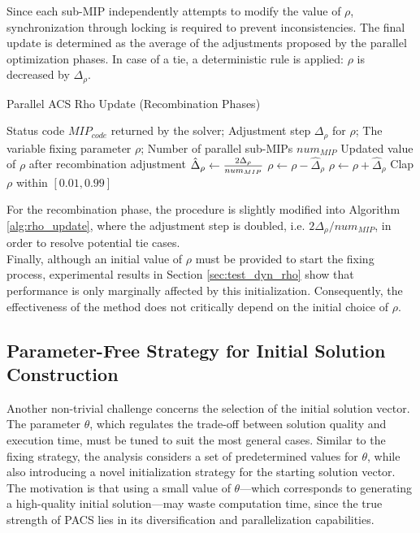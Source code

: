 Since each sub-MIP independently attempts to modify the value of $\rho$, synchronization through locking is required to prevent inconsistencies. The final update is determined as the average of the adjustments proposed by the parallel optimization phases. In case of a tie, a deterministic rule is applied: $\rho$ is decreased by $\Delta_\rho$.  
\begin{algorithm}[H]
\caption{Parallel ACS Rho Update (Recombination Phases)}\label{alg:rho_update}
\begin{algorithmic}[1]
\Require Status code $MIP_{code}$ returned by the solver; Adjustment step $\Delta_\rho$ for $\rho$; The variable fixing parameter $\rho$; Number of parallel sub-MIPs $num_{MIP}$
\Ensure Updated value of $\rho$ after recombination adjustment
    \State $\hat\Delta_\rho \gets {2\Delta_\rho \over{num_{MIP}}}$
        \State $\rho \gets \rho - \hat\Delta_\rho$
    \EndIf
        \State $\rho \gets \rho + \hat\Delta_\rho$
    \EndIf
    \State Clap $\rho$ within $[0.01,0.99]$
\EndFunction
\end{algorithmic}
\end{algorithm}
For the recombination phase, the procedure is slightly modified into Algorithm \ref{alg:rho_update}, where the adjustment step is doubled, i.e. $2\Delta_\rho / num_{MIP}$, in order to resolve potential tie cases.\\
Finally, although an initial value of $\rho$ must be provided to start the fixing process, experimental results in Section \ref{sec:test_dyn_rho} show that performance is only marginally affected by this initialization. Consequently, the effectiveness of the method does not critically depend on the initial choice of $\rho$.

\subsection{Parameter-Free Strategy for Initial Solution Construction}\label{sec:init_sol_maxFeas}
Another non-trivial challenge concerns the selection of the initial solution vector. The parameter $\theta$, which regulates the trade-off between solution quality and execution time, must be tuned to suit the most general cases. Similar to the fixing strategy, the analysis considers a set of predetermined values for $\theta$, while also introducing a novel initialization strategy for the starting solution vector.  
The motivation is that using a small value of $\theta$---which corresponds to generating a high-quality initial solution---may waste computation time, since the true strength of PACS lies in its diversification and parallelization capabilities.  

